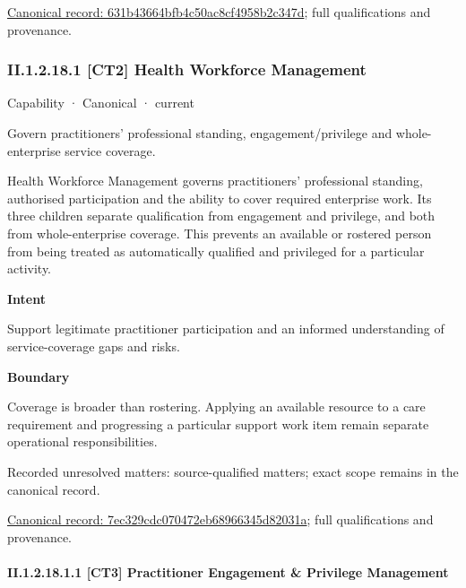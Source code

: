 {\footnotesize \href{../../../../continuum/strategy/capability/631b43664bfb4c50ac8cf4958b2c347d.md}{Canonical record: 631b43664bfb4c50ac8cf4958b2c347d}; full qualifications and provenance.}\par
\subsubsection*{II.1.2.18.1 [CT2] Health Workforce Management}
\label{navigation:II.1.2.18.1}

\label{element:7ec329cdc070472eb68966345d82031a}
{\small Capability · Canonical · current}\par

Govern practitioners’ professional standing, engagement/privilege and whole-enterprise service coverage.



Health Workforce Management governs practitioners' professional standing, authorised participation and the ability to cover required enterprise work. Its three children separate qualification from engagement and privilege, and both from whole-enterprise coverage. This prevents an available or rostered person from being treated as automatically qualified and privileged for a particular activity.



\textbf{Intent}



Support legitimate practitioner participation and an informed understanding of service-coverage gaps and risks.



\textbf{Boundary}



Coverage is broader than rostering. Applying an available resource to a care requirement and progressing a particular support work item remain separate operational responsibilities.


{\small Recorded unresolved matters: source-qualified matters; exact scope remains in the canonical record.}\par
{\footnotesize \href{../../../../continuum/strategy/capability/7ec329cdc070472eb68966345d82031a.md}{Canonical record: 7ec329cdc070472eb68966345d82031a}; full qualifications and provenance.}\par
\paragraph*{II.1.2.18.1.1 [CT3] Practitioner Engagement \& Privilege Management}
\label{navigation:II.1.2.18.1.1}

